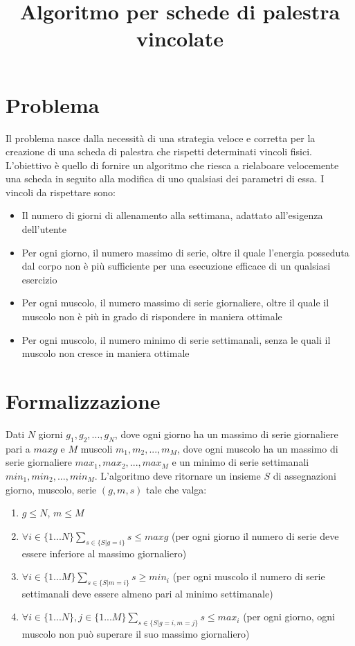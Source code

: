 \documentclass{article}
\title{Algoritmo per schede di palestra vincolate}
\begin{document}
\section{Problema}
Il problema nasce dalla necessità di una strategia veloce e corretta per la
creazione di una scheda di palestra che rispetti determinati vincoli fisici.
L'obiettivo è quello di fornire un algoritmo che riesca a rielaboare velocemente
una scheda in seguito alla modifica di uno qualsiasi dei parametri di essa.
I vincoli da rispettare sono:
\begin{itemize}
    \item Il numero di giorni di allenamento alla settimana, adattato
    all'esigenza dell'utente
    \item Per ogni giorno, il numero massimo di serie, oltre il quale l'energia
    posseduta dal corpo non è più sufficiente per una esecuzione efficace di un
    qualsiasi esercizio
    \item Per ogni muscolo, il numero massimo di serie giornaliere, oltre il
    quale il muscolo non è più in grado di rispondere in maniera ottimale
    \item Per ogni muscolo, il numero minimo di serie settimanali, senza le
    quali il muscolo non cresce in maniera ottimale
\end{itemize}

\section{Formalizzazione}

Dati $N$ giorni $g_1, g_2, ..., g_N$, dove ogni giorno ha un massimo di serie
giornaliere pari a $maxg$ e $M$ muscoli $m_1, m_2, ..., m_M$, dove ogni muscolo
ha un massimo di serie giornaliere $max_1, max_2, ..., max_M$ e un minimo di
serie settimanali $min_1, min_2, ..., min_M$. L'algoritmo deve ritornare un
insieme $S$ di assegnazioni giorno, muscolo, serie $(g, m, s)$ tale che valga:

\begin{enumerate}
    \item \label{one}   $g \leq N$, $m \leq M$
    \item \label{two}   $\forall i \in \{1...N\} \sum_{s \in \{S | g = i\}}s \leq maxg$ (per ogni giorno il numero di serie deve essere inferiore al massimo giornaliero)
    \item \label{three} $\forall i \in \{1...M\} \sum_{s \in \{ S | m = i\}} s \geq min_i$ (per ogni muscolo il numero di serie settimanali deve essere almeno pari al minimo settimanale)
    \item \label{four}  $\forall i \in \{1...N\}, j \in \{1...M\} \sum_{s \in \{S | g = i, m = j\}} s \leq max_i$ (per ogni giorno, ogni muscolo non può superare il suo massimo giornaliero)
\end{enumerate}
\end{document}
